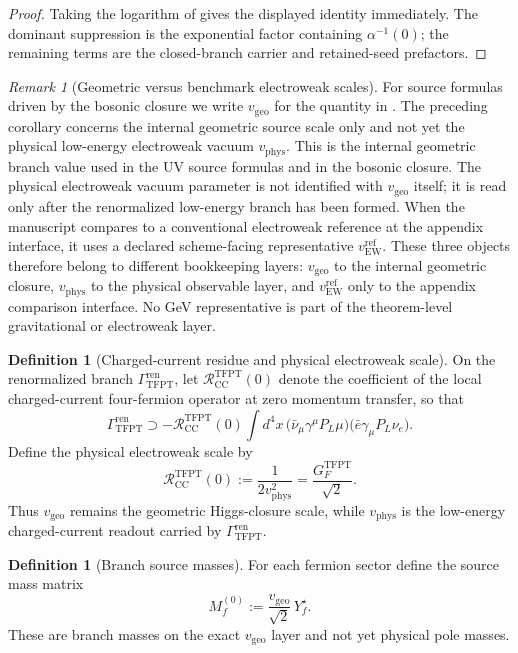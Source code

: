 \documentclass[11pt,a4paper]{article}
\theoremstyle{definition}
\newtheorem{definition}[theorem]{Definition}
\theoremstyle{remark}
\newtheorem*{remark}{Remark}
\newcommand{\vgeo}{v_{\mathrm{geo}}}
\newcommand{\vewref}{v_{\mathrm{EW}}^{\mathrm{ref}}}
\newcommand{\GrenTFPT}{\Gamma_{\mathrm{TFPT}}^{\mathrm{ren}}}
\begin{document}
\begin{proof}
Taking the logarithm of  gives the displayed identity immediately. The
dominant suppression is the exponential factor containing $\alpha^{-1}(0)$; the remaining terms are
the closed-branch carrier and retained-seed prefactors.
\end{proof}

\begin{remark}[Geometric versus benchmark electroweak scales]
For source formulas driven by the bosonic closure we write $\vgeo$ for the quantity in
. The preceding corollary concerns the internal geometric source scale
only and not yet the physical low-energy electroweak vacuum $v_{\mathrm{phys}}$. This is the
internal geometric branch value used in the UV source formulas and in the bosonic closure. The
physical electroweak vacuum parameter is not identified with $\vgeo$ itself; it is read only after
the renormalized low-energy branch has been formed. When the manuscript compares to a conventional
electroweak reference at the appendix interface, it uses a declared scheme-facing representative
$\vewref$. These three objects therefore belong to different
bookkeeping layers: $\vgeo$ to the internal geometric closure, $v_{\mathrm{phys}}$ to the physical
observable layer, and $\vewref$ only to the appendix comparison interface. No GeV representative is
part of the theorem-level gravitational or electroweak layer.
\end{remark}

\begin{definition}[Charged-current residue and physical electroweak scale]
\label{def:physical-ew-scale}
On the renormalized branch $\GrenTFPT$, let $\mathcal R_{\mathrm{CC}}^{\mathrm{TFPT}}(0)$ denote the
coefficient of the local charged-current four-fermion operator at zero momentum transfer, so that
\[
\Gamma_{\mathrm{TFPT}}^{\mathrm{ren}}
\supset
-\mathcal R_{\mathrm{CC}}^{\mathrm{TFPT}}(0)
\int d^4x\,
\bigl(\bar\nu_\mu\gamma^\mu P_L\mu\bigr)\bigl(\bar e\gamma_\mu P_L\nu_e\bigr).
\]
Define the physical electroweak scale by
\[
\mathcal R_{\mathrm{CC}}^{\mathrm{TFPT}}(0)
:=
\frac{1}{2v_{\mathrm{phys}}^2}
=
\frac{G_F^{\mathrm{TFPT}}}{\sqrt2}.
\]
Thus $\vgeo$ remains the geometric Higgs-closure scale, while $v_{\mathrm{phys}}$ is the low-energy
charged-current readout carried by $\GrenTFPT$.
\end{definition}

\begin{definition}[Branch source masses]
\label{def:branch-source-masses}
For each fermion sector define the source mass matrix
\[
M_f^{(0)}:=\frac{\vgeo}{\sqrt2}\,Y_f^\star.
\]
These are branch masses on the exact $\vgeo$ layer and not yet physical pole masses.
\end{definition}
\end{document}
